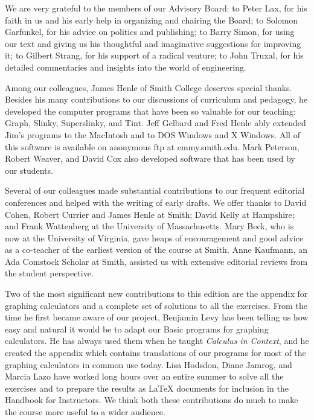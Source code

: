 We are very grateful to the members of our Advisory Board: to Peter
Lax, for his faith in us and his early help in organizing and chairing
the Board; to Solomon Garfunkel, for his advice on politics and
publishing; to Barry Simon, for using our text and giving us his
thoughtful and imaginative suggestions for improving it; to Gilbert
Strang, for his support of a radical venture; to John Truxal, for his
detailed commentaries and insights into the world of engineering.

Among our colleagues, James Henle of Smith College deserves special
thanks.  Besides his many contributions to our discussions of
curriculum and pedagogy, he developed the computer programs that have
been so valuable for our teaching: Graph, Slinky, Superslinky, and
Tint.  Jeff Gelbard and Fred Henle ably extended Jim's programs to the
MacIntosh and to DOS Windows and X Windows.  All of this software is
available on anonymous ftp at emmy.smith.edu.  Mark Peterson, Robert
Weaver, and David Cox also developed software that has been used by
our students.

Several of our colleagues made substantial contributions to our
frequent editorial conferences and helped with the writing of early
drafts.  We offer thanks to David Cohen, Robert Currier and James
Henle at Smith; David Kelly at Hampshire; and Frank Wattenberg at the
University of Massachusetts.  Mary Beck, who is now at the University
of Virginia, gave heaps of encouragement and good advice as a
co-teacher of the earliest version of the course at Smith.  Anne
Kaufmann, an Ada Comstock Scholar at Smith, assisted us with extensive
editorial reviews from the student perspective.

Two of the most significant new contributions to this edition are the
appendix for graphing calculators and a complete set of solutions to
all the exercises.  From the time he first became aware of our
project, Benjamin Levy has been telling us how easy and natural it
would be to adapt our Basic programs for graphing calculators.  He has
always used them when he taught {\em Calculus in Context}, and he
created the appendix which contains translations of our programs for
most of the graphing calculators in common use today.  Lisa Hodsdon,
Diane Jamrog, and Marcia Lazo have worked long hours over an entire
summer to solve all the exercises and to prepare the results as
\LaTeX{} documents for inclusion in the Handbook for Instructors.  We
think both these contributions do much to make the course more useful
to a wider audience.

